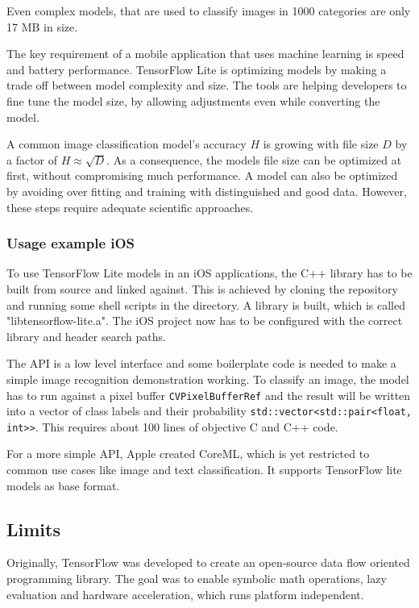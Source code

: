 \documentclass[11pt]{article}
\begin{document}
Even complex models, that are used to classify images in 1000 categories are only 17 MB in size.

The key requirement of a mobile application that uses machine learning is speed and battery performance.
TensorFlow Lite is optimizing models by making a trade off between model complexity and size.
The tools are helping developers to fine tune the model size, by allowing adjustments even while converting the model.

A common image classification model's accuracy $H$ is growing with file size $D$ by a factor of $H\approx\sqrt{D}$.
As a consequence, the models file size can be optimized at first, without compromising much performance.
A model can also be optimized by avoiding over fitting and training with distinguished and good data.
However, these steps require adequate scientific approaches.

\subsubsection{Usage example iOS}

To use TensorFlow Lite models in an iOS applications, the C++ library has to be built from source and linked against.
This is achieved by cloning the repository and running some shell scripts in the directory.
A library is built, which is called "libtensorflow-lite.a".
The iOS project now has to be configured with the correct library and header search paths.

The API is a low level interface and some boilerplate code is needed to make a simple image recognition demonstration working.
To classify an image, the model has to run against a pixel buffer \lstinline{CVPixelBufferRef} and the result will be written into a vector of class labels and their probability \lstinline{std::vector<std::pair<float, int>>}.
This requires about 100 lines of objective C and C++ code.

For a more simple API, Apple created CoreML, which is yet restricted to common use cases like image and text classification.
It supports TensorFlow lite models as base format.

\subsection{Limits}

Originally, TensorFlow was developed to create an open-source data flow oriented programming library.
The goal was to enable symbolic math operations, lazy evaluation and hardware acceleration, which runs platform independent.
\end{document}
